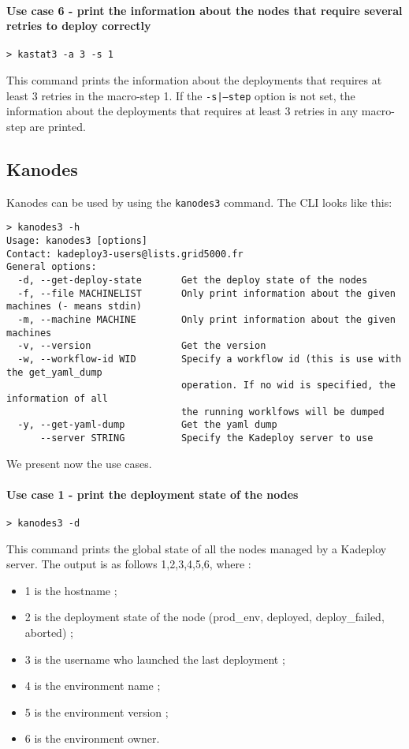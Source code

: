 \documentclass[a4wide,10pt,oneside]{book}
\begin{document}
\paragraph{Use case 6 - print the information about the nodes that require several retries to deploy correctly}
\begin{verbatim}
> kastat3 -a 3 -s 1
\end{verbatim}
This command prints the information about the deployments that requires at least 3 retries in the macro-step 1. If the \texttt{-s|--step} option is not set, the information about the deployments that requires at least 3 retries in any macro-step are printed.


\subsection{Kanodes}\label{sec:kanodes}
Kanodes can be used by using the \texttt{kanodes3} command. The CLI looks like this:
\begin{small}
\begin{verbatim}
> kanodes3 -h
Usage: kanodes3 [options]
Contact: kadeploy3-users@lists.grid5000.fr
General options:
  -d, --get-deploy-state       Get the deploy state of the nodes
  -f, --file MACHINELIST       Only print information about the given machines (- means stdin)
  -m, --machine MACHINE        Only print information about the given machines
  -v, --version                Get the version
  -w, --workflow-id WID        Specify a workflow id (this is use with the get_yaml_dump 
                               operation. If no wid is specified, the information of all
                               the running worklfows will be dumped
  -y, --get-yaml-dump          Get the yaml dump
      --server STRING          Specify the Kadeploy server to use
\end{verbatim}
\end{small}

We present now the use cases.
\paragraph{Use case 1 - print the deployment state of the nodes}
\begin{verbatim}
> kanodes3 -d
\end{verbatim}
This command prints the global state of all the nodes managed by a Kadeploy server. The output is as follows 1,2,3,4,5,6, where :
\begin{itemize}
\item 1 is the hostname ;
\item 2 is the deployment state of the node (prod\_env, deployed, deploy\_failed, aborted) ;
\item 3 is the username who launched the last deployment ;
\item 4 is the environment name ;
\item 5 is the environment version ;
\item 6 is the environment owner.
\end{itemize}
\end{document}
